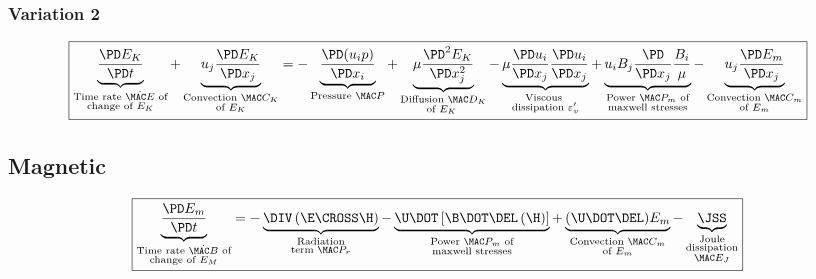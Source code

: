 \documentclass[11pt]{article}
\begin{document}
\subsubsection{Variation 2}
\begin{equation}
	\boxed{
	\underbrace{\frac{\PD E_K}{\PD t}}_{\substack{\text{Time rate $\dot{\MAC E}$ of} \\ \text{change of $E_K$}}} +
	\underbrace{u_j \frac{\PD E_K}{\PD x_j}}_
	{\substack{\text{Convection } \MAC C_K \\\text{of $E_K$}}}
	=
	- \underbrace{\frac{\PD (u_i p)}{\PD x_i}}_{\text{Pressure } \MAC P}
	+ \underbrace{ \mu \frac{\PD^2 E_K}{\PD x_j^2} }_{\substack{\text{Diffusion } \MAC D_K \\ \text{of $E_K$ }}}
	- \underbrace{\mu \frac{\PD u_i}{\PD x_j}\frac{\PD u_i}{\PD x_j} }_{\substack{\text{Viscous } \\ \text{dissipation } \varepsilon_v'}}
	+ \underbrace{u_i B_j \frac{\PD}{\PD x_j} \frac{B_i}{\mu}}_
	{\substack{\text{Power $\MAC P_{m}$ of}\\\text{maxwell stresses}}}
	- \underbrace{u_j \frac{\PD E_m}{\PD x_j}}_
	{\substack{\text{Convection $\MAC C_m$}\\\text{of $E_m$}}}
	}
\end{equation}

\subsection{Magnetic}
\begin{equation}
	\boxed{
	\underbrace{\frac{\PD E_m}{\PD t} }_
	{\substack{\text{Time rate $\dot{\MAC B}$ of}\\\text{change of $E_M$}}}
	=
	- \underbrace{\DIV \left(\E \CROSS \H \right)}_
	{\substack{\text{Radiation}\\\text{term $\MAC P_{r}$}}}
	- \underbrace{\U \DOT \left[\B \DOT \DEL \left( \H \right) \right]}_
	{\substack{\text{Power $\MAC P_{m}$ of}\\\text{maxwell stresses}}}
	+ \underbrace{(\U \DOT \DEL) E_m}_
	{\substack{\text{Convection $\MAC C_m$}\\\text{of $E_m$}}}
	- \underbrace{\JSS}_
	{\substack{\text{Joule}\\\text{dissipation}\\\text{$\MAC E_J$}}}
	}
\end{equation}
\end{document}
